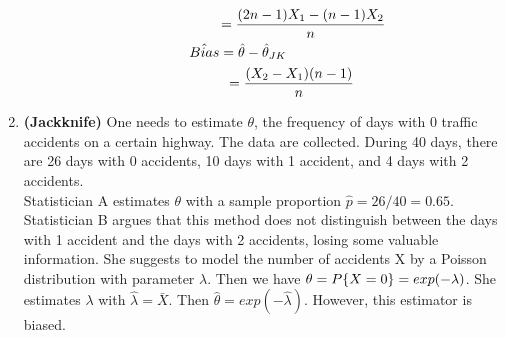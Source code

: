 \documentclass[12pt,fleqn]{article}\usepackage[]{graphicx}\usepackage[]{color}
\makeatletter
\newcommand{\hlnum}[1]{\textcolor[rgb]{0.686,0.059,0.569}{#1}}%
\newcommand{\hlcom}[1]{\textcolor[rgb]{0.678,0.584,0.686}{\textit{#1}}}%
\newcommand{\hlopt}[1]{\textcolor[rgb]{0,0,0}{#1}}%
\newcommand{\hlstd}[1]{\textcolor[rgb]{0.345,0.345,0.345}{#1}}%
\newcommand{\hlkwa}[1]{\textcolor[rgb]{0.161,0.373,0.58}{\textbf{#1}}}%
\newcommand{\hlkwb}[1]{\textcolor[rgb]{0.69,0.353,0.396}{#1}}%
\newcommand{\hlkwc}[1]{\textcolor[rgb]{0.333,0.667,0.333}{#1}}%
\newcommand{\hlkwd}[1]{\textcolor[rgb]{0.737,0.353,0.396}{\textbf{#1}}}%
\newenvironment{kframe}{%
 \def\at@end@of@kframe{}%
 \ifinner\ifhmode%
  \def\at@end@of@kframe{\end{minipage}}%
  \begin{minipage}{\columnwidth}%
 \fi\fi%
 \def\FrameCommand##1{\hskip\@totalleftmargin \hskip-\fboxsep
 \colorbox{shadecolor}{##1}\hskip-\fboxsep
     \hskip-\linewidth \hskip-\@totalleftmargin \hskip\columnwidth}%
 \MakeFramed {\advance\hsize-\width
   \@totalleftmargin\z@ \linewidth\hsize
   \@setminipage}}%
 {\par\unskip\endMakeFramed%
 \at@end@of@kframe}
\newenvironment{knitrout}{}{} %
\theoremstyle{definition}
\makeatother
\begin{document}
\begin{enumerate}[1.]
\begin{enumerate}[(a)]
\begin{enumerate}[i.]
\begin{align*}
  			          &\hspace{0.7cm}    = \frac{(2n-1)X_1-(n-1)X_{2}}{n}\\
  			          &\hat{Bias} = \hat{\theta} - \hat{\theta}_{JK}\\
  			          &\hspace{0.9cm}  = \frac{(X_{2}-X_{1})(n-1)}{n}
  			        \end{align*}
            \end{enumerate}
		\end{enumerate}

  \item \textbf{(Jackknife)} One needs to estimate $\theta$, the frequency of days with 0 traffic accidents on a certain highway. The data are collected. During 40 days, there are 26 days with 0 accidents, 10 days with 1 accident, and 4 days with 2 accidents.\\
  Statistician A estimates $\theta$ with a sample proportion $\hat{p} = 26/40 = 0.65$.\\
  Statistician B argues that this method does not distinguish between the days with 1 accident and the days with 2 accidents, losing some valuable information. She suggests to model the number of accidents X by a Poisson distribution with parameter $\lambda$. Then we have $\theta = \boldmath{P}\{X = 0\} = exp(-\lambda)$. She estimates $\lambda$ with $\hat{\lambda} = \bar{X}$. Then $\hat{\theta} = exp(-\hat{\lambda})$. However, this estimator is biased.
\end{enumerate}
\end{document}
